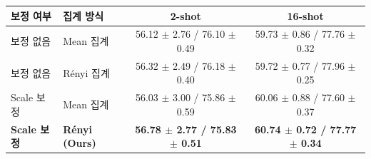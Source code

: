 \documentclass[10pt,letterpaper]{article}
\begin{document}
\noindent\scriptsize\setlength{\tabcolsep}{4pt}
\begin{tabular}{l l c c}
\toprule
보정 여부 & 집계 방식 & 2-shot & 16-shot \\
\midrule
보정 없음 & Mean 집계 & 56.12 $\pm$ 2.76 / 76.10 $\pm$ 0.49 & 59.73 $\pm$ 0.86 / 77.76 $\pm$ 0.32 \\
보정 없음 & Rényi 집계 & 56.32 $\pm$ 2.49 / 76.18 $\pm$ 0.40 & 59.72 $\pm$ 0.77 / 77.96 $\pm$ 0.25 \\
Scale 보정 & Mean 집계 & 56.03 $\pm$ 3.00 / 75.86 $\pm$ 0.59 & 60.06 $\pm$ 0.88 / 77.60 $\pm$ 0.37 \\
\textbf{Scale 보정} & \textbf{Rényi (Ours)} & \textbf{56.78 $\pm$ 2.77 / 75.83 $\pm$ 0.51} & \textbf{60.74 $\pm$ 0.72 / 77.77 $\pm$ 0.34} \\
\bottomrule
\end{tabular}
\end{document}
